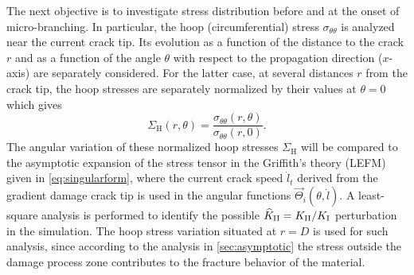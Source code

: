 The next objective is to investigate stress distribution before and at the onset of micro-branching. In particular, the hoop (circumferential) stress $\sigma_{\theta\theta}$ is analyzed near the current crack tip. Its evolution as a function of the distance to the crack $r$ and as a function of the angle $\theta$ with respect to the propagation direction ($x$-axis) are separately considered. For the latter case, at several distances $r$ from the crack tip, the hoop stresses are separately normalized by their values at $\theta=0$ which gives
\[
\Sigma_\mathrm{H}(r,\theta)=\frac{\sigma_{\theta\theta}(r,\theta)}{\sigma_{\theta\theta}(r,0)}.
\]
The angular variation of these normalized hoop stresses $\Sigma_\mathrm{H}$ will be compared to the asymptotic expansion of the stress tensor in the Griffith's theory (LEFM) given in \eqref{eq:singularform}, where the current crack speed $\dot{l}_t$ derived from the gradient damage crack tip is used in the angular functions $\vec{\Theta}_i(\theta,\dot{l})$. A least-square analysis is performed to identify the possible $\widehat{K}_\RNN{2}=K_\RNN{2}/K_\RNN{1}$ perturbation in the simulation. The hoop stress variation situated at $r=D$ is used for such analysis, since according to the analysis in \cref{sec:asymptotic} the stress outside the damage process zone contributes to the fracture behavior of the material.

